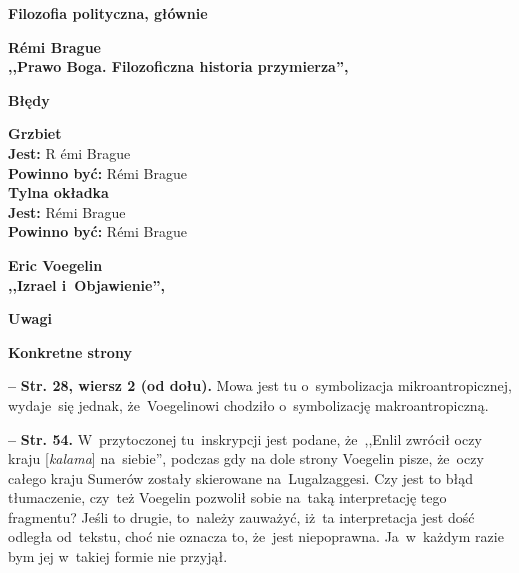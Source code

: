 \documentclass[a4paper,11pt]{article}
\newcommand{\spaceOne}{2em}
\newcommand{\spaceTwo}{1em}
\newcommand{\spaceThree}{0.25em}
\newcommand{\tb}{\textbf}
\newcommand{\noi}{\noindent}
\newcommand{\start}{\noi \tb{--} {}}
\newcommand{\Center}[1]{\begin{center} #1 \end{center}}
\newcommand{\CenterTB}[1]{\Center{\tb{#1}}}
\newcommand{\Str}[1]{\tb{Str. #1.}}
\newcommand{\StrWd}[2]{\tb{Str. #1, wiersz #2 (od dołu).}}
\newcommand{\Jest}{\tb{Jest: }}
\newcommand{\Pow}{\tb{Powinno być: }}
\newcommand{\Field}[1]{ \begin{center} {\Large \tb{#1} } \end{center} }
\newcommand{\Work}[1]{ \begin{center} {\large \tb{#1}} \end{center} }
\begin{document}





\newpage
\Field{Filozofia polityczna, głównie}

\vspace{\spaceTwo}



\Work{
  R\'{e}mi Brague \\
  ,,Prawo Boga. Filozoficzna historia przymierza'', \cite{Bra14} }


\CenterTB{Błędy}

\noi
\tb{Grzbiet} \\
\Jest R \'{e}mi {\small Brague} \\
\Pow R\'{e}mi Brague \\
\tb{Tylna okładka} \\
\Jest R\'{e}mi {\small Brague} \\
\Pow R\'{e}mi Brague \\

\vspace{\spaceOne}





\Work{
  Eric Voegelin \\
  ,,Izrael i~Objawienie'', \cite{Voe14} }


\CenterTB{Uwagi}

\noi \tb{Konkretne strony}

\vspace{\spaceThree}

\start \StrWd{28}{2} Mowa jest tu o~symbolizacja mikroantropicznej,
wydaje~się jednak, że~Voegelinowi chodziło o~symbolizację
makroantropiczną.

\vspace{\spaceThree}


\start \Str{54} W~przytoczonej tu~inskrypcji jest podane, że~,,Enlil
zwrócił oczy kraju [\emph{kalama}] na~siebie'', podczas gdy na dole
strony Voegelin pisze, że~oczy całego kraju Sumerów zostały skierowane
na~Lugalzaggesi. Czy jest to błąd tłumaczenie, czy~też Voegelin
pozwolił sobie na~taką interpretację tego fragmentu? Jeśli to drugie,
to~należy zauważyć, iż~ta interpretacja jest dość odległa od~tekstu,
choć nie oznacza to, że~jest niepoprawna. Ja~w~każdym razie bym jej
w~takiej formie nie przyjął.
\end{document}
